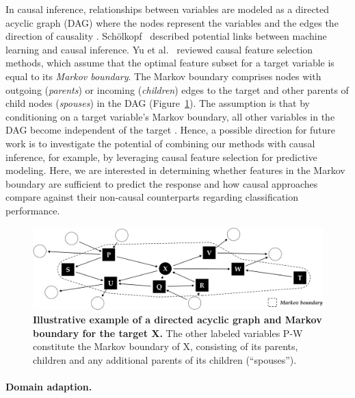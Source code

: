 \documentclass[
  oneside]{book}
\begin{document}
In causal inference, relationships between variables are modeled as a directed acyclic graph (DAG) where the nodes represent the variables and the edges the direction of causality \autocite{Hernan:CausalityBook2020,Pearl:BookOfWhy2018}.
Schölkopf~\autocite{scholkopf2019causality} described potential links between machine learning and causal inference.
Yu et al.~\autocite{yu2020causality} reviewed causal feature selection methods, which assume that the optimal feature subset for a target variable is equal to its \emph{Markov boundary}.
The Markov boundary comprises nodes with outgoing (\emph{parents}) or incoming (\emph{children}) edges to the target and other parents of child nodes (\emph{spouses}) in the DAG (Figure~\ref{fig:10-markov-boundary}).
The assumption is that by conditioning on a target variable's Markov boundary, all other variables in the DAG become independent of the target \autocite{yu2020causality}.
Hence, a possible direction for future work is to investigate the potential of combining our methods with causal inference, for example, by leveraging causal feature selection for predictive modeling.
Here, we are interested in determining whether features in the Markov boundary are sufficient to predict the response and how causal approaches compare against their non-causal counterparts regarding classification performance.



\begin{figure}[htb]

{\centering \includegraphics[width=1\linewidth]{figures/10-markov-boundary} 

}

\caption{\textbf{Illustrative example of a directed acyclic graph and Markov boundary for the target X.} The other labeled variables P-W constitute the Markov boundary of X, consisting of its parents, children and any additional parents of its children (``spouses'').}\label{fig:10-markov-boundary}
\end{figure}

\paragraph*{Domain adaption.}
\end{document}
